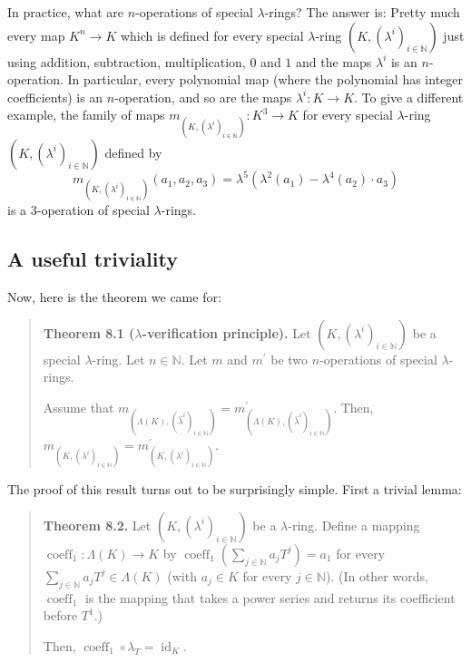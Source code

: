 \documentclass[numbers=enddot,12pt,final,onecolumn,notitlepage]{scrartcl}%
\begin{document}
In practice, what are $n$-operations of special $\lambda$-rings? The answer
is: Pretty much every map $K^{n}\rightarrow K$ which is defined for every
special $\lambda$-ring $\left(  K,\left(  \lambda^{i}\right)  _{i\in
\mathbb{N}}\right)  $ just using addition, subtraction, multiplication, $0$
and $1$ and the maps $\lambda^{i}$ is an $n$-operation. In particular, every
polynomial map (where the polynomial has integer coefficients) is an
$n$-operation, and so are the maps $\lambda^{i}:K\rightarrow K$. To give a
different example, the family of maps $m_{\left(  K,\left(  \lambda
^{i}\right)  _{i\in\mathbb{N}}\right)  }:K^{3}\rightarrow K$ for every special
$\lambda$-ring $\left(  K,\left(  \lambda^{i}\right)  _{i\in\mathbb{N}%
}\right)  $ defined by%
\[
m_{\left(  K,\left(  \lambda^{i}\right)  _{i\in\mathbb{N}}\right)  }\left(
a_{1},a_{2},a_{3}\right)  =\lambda^{5}\left(  \lambda^{2}\left(  a_{1}\right)
-\lambda^{4}\left(  a_{2}\right)  \cdot a_{3}\right)
\]
is a $3$-operation of special $\lambda$-rings.

\subsection{A useful triviality}

Now, here is the theorem we came for:

\begin{quote}
\textbf{Theorem 8.1 (}$\lambda$\textbf{-verification principle).} Let $\left(
K,\left(  \lambda^{i}\right)  _{i\in\mathbb{N}}\right)  $ be a special
$\lambda$-ring. Let $n\in\mathbb{N}$. Let $m$ and $m^{\prime}$ be two
$n$-operations of special $\lambda$-rings.

Assume that $m_{\left(  \Lambda\left(  K\right)  ,\left(  \widehat{\lambda
}^{i}\right)  _{i\in\mathbb{N}}\right)  }=m_{\left(  \Lambda\left(  K\right)
,\left(  \widehat{\lambda}^{i}\right)  _{i\in\mathbb{N}}\right)  }^{\prime}$.
Then, $m_{\left(  K,\left(  \lambda^{i}\right)  _{i\in\mathbb{N}}\right)
}=m_{\left(  K,\left(  \lambda^{i}\right)  _{i\in\mathbb{N}}\right)  }%
^{\prime}$.
\end{quote}

The proof of this result turns out to be surprisingly simple. First a trivial lemma:

\begin{quote}
\textbf{Theorem 8.2.} Let $\left(  K,\left(  \lambda^{i}\right)
_{i\in\mathbb{N}}\right)  $ be a $\lambda$-ring. Define a mapping
$\operatorname*{coeff}\nolimits_{1}:\Lambda\left(  K\right)  \rightarrow K$ by
$\operatorname*{coeff}\nolimits_{1}\left(  \sum\limits_{j\in\mathbb{N}}%
a_{j}T^{j}\right)  =a_{1}$ for every $\sum\limits_{j\in\mathbb{N}}a_{j}%
T^{j}\in\Lambda\left(  K\right)  $ (with $a_{j}\in K$ for every $j\in
\mathbb{N}$). (In other words, $\operatorname*{coeff}\nolimits_{1}$ is the
mapping that takes a power series and returns its coefficient before $T^{1}$.)

Then, $\operatorname*{coeff}\nolimits_{1}\circ\lambda_{T}=\operatorname*{id}%
_{K}$.
\end{quote}
\end{document}
